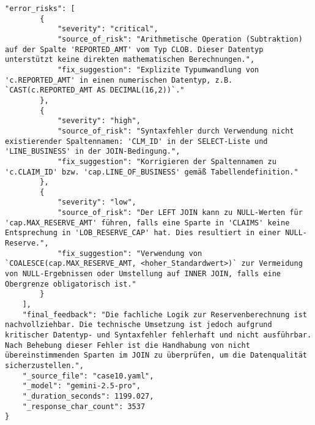 \begin{lstlisting}[caption={Ausgabe: Gemini 2.5 Pro Anwendungsfall 10 Hauptdurchlauf},label={gemini_case10_prompt1}]
    "error_risks": [
        {
            "severity": "critical",
            "source_of_risk": "Arithmetische Operation (Subtraktion) auf der Spalte 'REPORTED_AMT' vom Typ CLOB. Dieser Datentyp unterstützt keine direkten mathematischen Berechnungen.",
            "fix_suggestion": "Explizite Typumwandlung von 'c.REPORTED_AMT' in einen numerischen Datentyp, z.B. `CAST(c.REPORTED_AMT AS DECIMAL(16,2))`."
        },
        {
            "severity": "high",
            "source_of_risk": "Syntaxfehler durch Verwendung nicht existierender Spaltennamen: 'CLM_ID' in der SELECT-Liste und 'LINE_BUSINESS' in der JOIN-Bedingung.",
            "fix_suggestion": "Korrigieren der Spaltennamen zu 'c.CLAIM_ID' bzw. 'cap.LINE_OF_BUSINESS' gemäß Tabellendefinition."
        },
        {
            "severity": "low",
            "source_of_risk": "Der LEFT JOIN kann zu NULL-Werten für 'cap.MAX_RESERVE_AMT' führen, falls eine Sparte in 'CLAIMS' keine Entsprechung in 'LOB_RESERVE_CAP' hat. Dies resultiert in einer NULL-Reserve.",
            "fix_suggestion": "Verwendung von `COALESCE(cap.MAX_RESERVE_AMT, <hoher_Standardwert>)` zur Vermeidung von NULL-Ergebnissen oder Umstellung auf INNER JOIN, falls eine Obergrenze obligatorisch ist."
        }
    ],
    "final_feedback": "Die fachliche Logik zur Reservenberechnung ist nachvollziehbar. Die technische Umsetzung ist jedoch aufgrund kritischer Datentyp- und Syntaxfehler fehlerhaft und nicht ausführbar. Nach Behebung dieser Fehler ist die Handhabung von nicht übereinstimmenden Sparten im JOIN zu überprüfen, um die Datenqualität sicherzustellen.",
    "_source_file": "case10.yaml",
    "_model": "gemini-2.5-pro",
    "_duration_seconds": 1199.027,
    "_response_char_count": 3537
}
\end{lstlisting}

